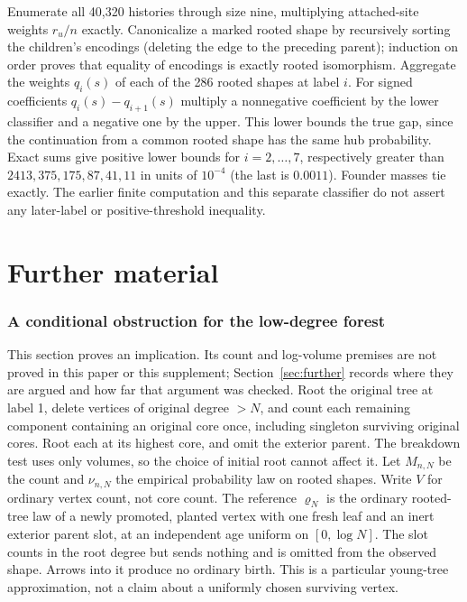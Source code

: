 \documentclass[11pt]{article}
\newcommand{\sectag}[1]{\renewcommand{\thesection}{#1}\renewcommand{\theHsection}{#1}}
\theoremstyle{remark}
\numberwithin{equation}{section}
\begin{document}
Enumerate all 40,320 histories through size nine, multiplying attached-site weights $r_u/n$ exactly. Canonicalize a marked rooted shape by recursively sorting the children's encodings (deleting the edge to the preceding parent); induction on order proves that equality of encodings is exactly rooted isomorphism. Aggregate the weights $q_i(s)$ of each of the 286 rooted shapes at label $i$. For signed coefficients $q_i(s)-q_{i+1}(s)$ multiply a nonnegative coefficient by the lower classifier and a negative one by the upper. This lower bounds the true gap, since the continuation from a common rooted shape has the same hub probability. Exact sums give positive lower bounds for $i=2,\ldots,7$, respectively greater than $2413,375,175,87,41,11$ in units of $10^{-4}$ (the last is $0.0011$). Founder masses tie exactly. The earlier finite computation and this separate classifier do not assert any later-label or positive-threshold inequality.

\part{Further material}

\sectag{FOR}
\section{A conditional obstruction for the low-degree forest}\label{sec:for}
This section proves an implication. Its count and log-volume premises are not proved in this paper or this supplement; Section~\ref{sec:further} records where they are argued and how far that argument was checked.
Root the original tree at label 1, delete vertices of original degree $>N$, and count each remaining component containing an original core once, including singleton surviving original cores. Root each at its highest core, and omit the exterior parent. The breakdown test uses only volumes, so the choice of initial root cannot affect it. Let $M_{n,N}$ be the count and $\nu_{n,N}$ the empirical probability law on rooted shapes. Write $V$ for ordinary vertex count, not core count. The reference $\varrho_N$ is the ordinary rooted-tree law of a newly promoted, planted vertex with one fresh leaf and an inert exterior parent slot, at an independent age uniform on $[0,\log N]$. The slot counts in the root degree but sends nothing and is omitted from the observed shape. Arrows into it produce no ordinary birth. This is a particular young-tree approximation, not a claim about a uniformly chosen surviving vertex.
\end{document}
